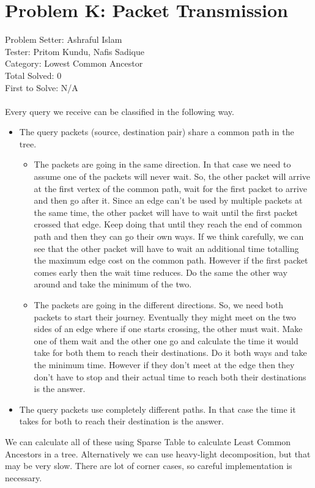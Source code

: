 \section*{Problem K: Packet Transmission}
Problem Setter: Ashraful Islam \\
Tester: Pritom Kundu, Nafis Sadique \\
Category: Lowest Common Ancestor \\
Total Solved: 0 \\
First to Solve: N/A \\
\\
Every query we receive can be classified in the following way.
\begin{itemize}[label=\scalebox{1.0}{$\bullet$}]
    \item The query packets (source, destination pair) share a common path in the tree. 
    \begin{itemize}[label=\scalebox{0.5}{$\blacksquare$}]
        \item The packets are going in the same direction. In that case we need to assume one of the
        packets will never wait. So, the other packet will arrive at the first vertex of the common path,
        wait for the first packet to arrive and then go after it. Since an edge can't be used by
        multiple packets at the same time, the other packet will have to wait until the first packet 
        crossed that edge. Keep doing that until they reach the end of common path and then they can 
        go their own ways. If we think carefully, we can see that the other packet will have to wait
        an additional time totalling the maximum edge cost on the common path. However if the first
        packet comes early then the wait time reduces. Do the same the other way around and take
        the minimum of the two.
        \item The packets are going in the different directions. So, we need both packets to start
        their journey. Eventually they might meet on the two sides of an edge where if one starts crossing,
        the other must wait. Make one of them wait and the other one go and calculate the time it would 
        take for both them to reach their destinations. Do it both ways and take the minimum time. However if
        they don't meet at the edge then they don't have to stop and their actual time to reach both 
        their destinations is the answer. 
    \end{itemize}
    \item The query packets use completely different paths. In that case the time it takes for both to reach
    their destination is the answer.
\end{itemize}
We can calculate all of these using Sparse Table to calculate Least Common Ancestors in a tree. Alternatively 
we can use heavy-light decomposition, but that may be very slow. There are lot of corner cases, so careful 
implementation is necessary.
